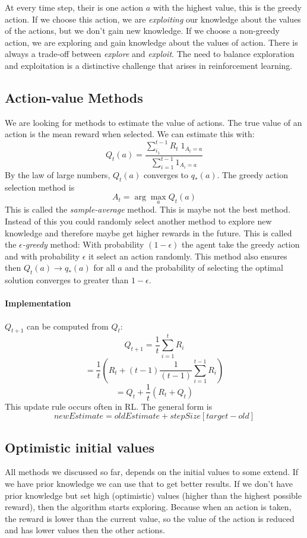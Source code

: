 \documentclass[10pt,a4paper]{article}
\begin{document}
At every time step, their is one action $a$ with the highest value, this is the greedy action. If we choose this action, we are \textit{exploiting} our knowledge about the values of the actions, but we don't gain new knowledge. If we choose a non-greedy action, we are exploring and gain knowledge about the values of action. 
There is always a trade-off between \textit{explore} and \textit{exploit}. The need to balance exploration
and exploitation is a distinctive challenge that arises in reinforcement learning.

\subsection{Action-value Methods}
We are looking for methods to estimate the value of actions. The true value of an action is the mean reward when selected. We can estimate this with:
\[ Q_t(a) = \frac{\sum_{i_1}^{t-1}R_t \; 1_{A_t=a}}{\sum_{i=1}^{t-1} 1_{A_i=a} } \]
By the law of large numbers, $Q_t(a)$ converges to $q_*(a)$.
The greedy action selection method is
\[ A_t = \arg\max_a Q_t(a) \]
This is called the \textit{sample-average} method. This is maybe not the best method. Instead of this you could randomly select another method to explore new knowledge and therefore maybe get higher rewards in the future.
This is called the $\epsilon$\textit{-greedy} method: With probability $(1-\epsilon)$ the agent take the greedy action and with probability $\epsilon$ it select an action randomly.
This method also ensures then $Q_t(a) \rightarrow q_*(a)$ for all $a$ and the probability of selecting the optimal solution converges to greater than $1-\epsilon$.

\paragraph{Implementation}
$Q_{t+1}$ can be computed from $Q_t$:
\[ Q_{t+1} = \frac{1}{t}\sum_{i=1}^t R_i \]
\[ = \frac{1}{t}(R_t + (t-1)\frac{1}{(t-1)}\sum_{i=1}^{t-1} R_i)\]
\[ = Q_t + \frac{1}{t}(R_t + Q_t) \]
This update rule occurs often in RL. The general form is
\[ newEstimate = oldEstimate + stepSize[target - old]\]

\subsection{Optimistic initial values}
All methods we discussed so far, depends on the initial values to some extend. If we have prior knowledge we can use that to get better results. If we don't have prior knowledge but set high (optimistic) values (higher than the highest possible reward), then the algorithm starts exploring. Because when an action is taken, the reward is lower than the current value, so the value of the action is reduced and has lower values then the other actions. 
\end{document}
